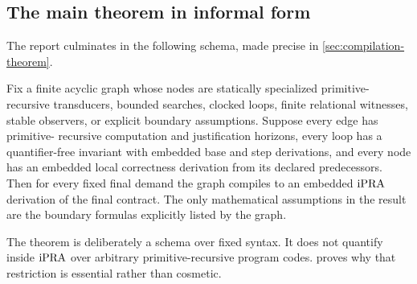 \subsection{The main theorem in informal form}

The report culminates in the following schema, made precise in
\cref{sec:compilation-theorem}.

\begin{schema}
Fix a finite acyclic graph whose nodes are statically specialized primitive-recursive
transducers, bounded searches, clocked loops, finite relational witnesses, stable
observers, or explicit boundary assumptions.  Suppose every edge has primitive-
recursive computation and justification horizons, every loop has a quantifier-free
invariant with embedded base and step derivations, and every node has an embedded local
correctness derivation from its declared predecessors.  Then for every fixed final
demand the graph compiles to an embedded \(\mathrm{iPRA}\) derivation of the final contract.
The only mathematical assumptions in the result are the boundary formulas explicitly
listed by the graph.
\end{schema}

The theorem is deliberately a schema over fixed syntax.  It does not quantify inside
\(\mathrm{iPRA}\) over arbitrary primitive-recursive program codes.  
proves why that restriction is essential rather than cosmetic.
